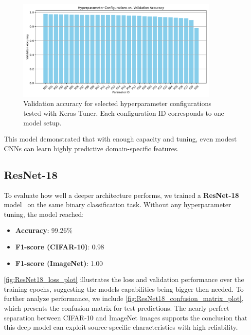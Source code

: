 \begin{figure}[H]
    \centering
    \includegraphics[width=0.9\textwidth]{Plots/ModelsAndResults/Hyperparameter_Config_plot.pdf}
    \caption{Validation accuracy for selected hyperparameter configurations tested with Keras Tuner. Each configuration ID corresponds to one model setup.}
    \label{fig:Hyperparameter_Config_plot}
\end{figure}

\raggedbottom
\addtolength{\topskip}{0pt plus 10pt}
This model demonstrated that with enough capacity and tuning, even modest CNNs can learn highly predictive domain-specific features.


\subsection{ResNet-18}

To evaluate how well a deeper architecture performs, we trained a \textbf{ResNet-18} model~\cite{he2016ResNet18} on the same binary classification task. 
Without any hyperparameter tuning, the model reached:

\begin{itemize}
    \item \textbf{Accuracy}: 99.26\%
    \item \textbf{F1-score (CIFAR-10)}: 0.98
    \item \textbf{F1-score (ImageNet)}: 1.00
\end{itemize}

\autoref{fig:ResNet18_loss_plot} illustrates the loss and validation performance over the training epochs, suggesting the models capabilities being bigger then needed.  
To further analyze performance, we include \autoref{fig:ResNet18_confusion_matrix_plot}, which presents the confusion matrix for test predictions. 
The nearly perfect separation between CIFAR-10 and ImageNet images supports the conclusion that this deep model can exploit source-specific characteristics with high reliability.

